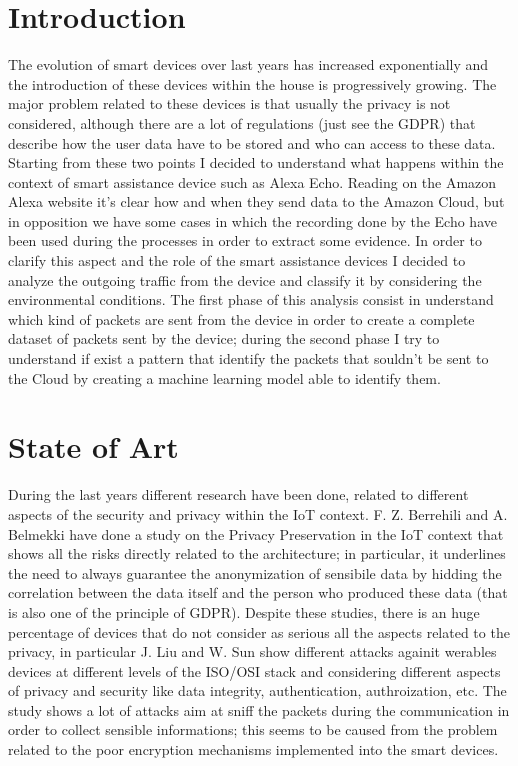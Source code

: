 \documentclass[sigconf]{acmart}
\begin{document}
    \maketitle


    \section{Introduction}
    The evolution of smart devices over last years has increased exponentially and the introduction of these devices within the house is progressively growing.
    The major problem related to these devices is that usually the privacy is not considered, although there are a lot of regulations (just see the GDPR) that describe how the user data have to be stored and who can access to these data.
    Starting from these two points I decided to understand what happens within the context of smart assistance device such as Alexa Echo.
    Reading on the Amazon Alexa website it's clear how and when they send data to the Amazon Cloud, but in opposition we have some cases in which the recording done by the Echo have been used during the processes in order to extract some evidence.
    In order to clarify this aspect and the role of the smart assistance devices I decided to analyze the outgoing traffic from the device and classify it by considering the environmental conditions.
    The first phase of this analysis consist in understand which kind of packets are sent from the device in order to create a complete dataset of packets sent by the device; during the second phase I try to understand if exist a pattern that identify the packets that souldn't be sent to the Cloud by creating a machine learning model able to identify them.


    \section{State of Art}
    During the last years different research have been done, related to different aspects of the security and privacy within the IoT context.
    F. Z. Berrehili and A. Belmekki \cite{berrehili} have done a study on the Privacy Preservation in the IoT context that shows all the risks directly related to the architecture; in particular, it underlines the need to always guarantee the anonymization of sensibile data by hidding the correlation between the data itself and the person who produced these data (that is also one of the principle of GDPR).
    Despite these studies, there is an huge percentage of devices that do not consider as serious all the aspects related to the privacy, in particular J. Liu and W. Sun \cite{liu} show different attacks againit werables devices at different levels of the ISO/OSI stack and considering different aspects of privacy and security like data integrity, authentication, authroization, etc. The study shows a lot of attacks aim at sniff the packets during the communication in order to collect sensible informations; this seems to be caused from the problem related to the poor encryption mechanisms implemented into the smart devices.
\end{document}
